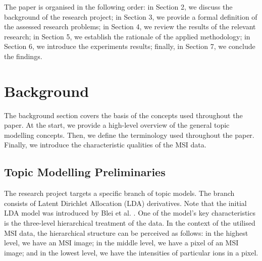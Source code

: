 \documentclass{mpaper}
\begin{document}
\par The paper is organised in the following order: in Section 2, we discuss the background of the research project; in Section 3, we provide a formal definition of the assessed research problems; in Section 4, we review the results of the relevant research; in Section 5, we establish the rationale of the applied methodology; in Section 6, we introduce the experiments results; finally, in Section 7, we conclude the findings. 

\section{Background}

\par The background section covers the basis of the concepts used throughout the paper. At the start, we provide a high-level overview of the general topic modelling concepts. Then, we define the terminology used throughout the paper. Finally, we introduce the characteristic qualities of the MSI data.  

\subsection{Topic Modelling Preliminaries}

\par The research project targets a specific branch of topic models. The branch consists of Latent Dirichlet Allocation (LDA) derivatives. Note that the initial LDA model was introduced by Blei et al. \cite{blei2003latent}. One of the model's key characteristics is the three-level hierarchical treatment of the data. In the context of the utilised MSI data, the hierarchical structure can be perceived as follows: in the highest level, we have an MSI image; in the middle level, we have a pixel of an MSI image; and in the lowest level, we have the intensities of particular ions in a pixel.
\end{document}

